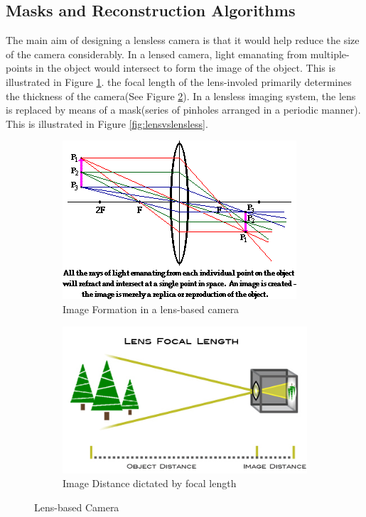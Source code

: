 \subsection{Masks and Reconstruction Algorithms}
The main aim of designing a lensless camera is that it would help reduce the size of the camera considerably. In a lensed camera, light emanating from multiple-points in the object would intersect to form the image of the object. This is illustrated in Figure \ref{fig:lens_image}. the focal length of the lens-involed primarily determines the thickness of the camera(See Figure \ref{fig:focal_length}). In a lensless imaging system, the lens is replaced by means of a mask(series of pinholes arranged in a periodic manner). This is illustrated in Figure \ref{fig:lensvslensless}.
\begin{figure}[ht]
\centering
\begin{subfigure}{0.75\textwidth}
  \centering
  \includegraphics[width=.5\linewidth]{pics/lensed_image_formation}
  \caption{Image Formation in a lens-based camera\cite{lens1}}
  \label{fig:lens_image}
\end{subfigure}
\begin{subfigure}{0.75\textwidth}
  \centering
  \includegraphics[width=.65\linewidth]{pics/focal_length}
  \caption{Image Distance dictated by focal length \cite{lens2}}
  \label{fig:focal_length}
\end{subfigure}
\caption{Lens-based Camera}
\label{fig:lens_based}
\end{figure}

